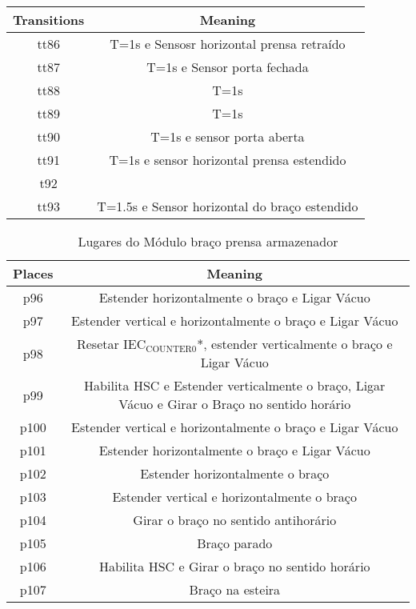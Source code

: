 \begin{center}
\begin{tabular}{c|c}
Transitions & Meaning\\
\hline
tt86 & T=1s e Sensosr horizontal prensa retraído\\
tt87 & T=1s e Sensor porta fechada\\
tt88 & T=1s\\
tt89 & T=1s\\
tt90 & T=1s e sensor porta aberta\\
tt91 & T=1s e sensor horizontal prensa estendido\\
t92 & \\
tt93 & T=1.5s e Sensor horizontal do braço estendido\\
\end{tabular}
\end{center}
\begin{table}[htbp]
\caption{Lugares do Módulo braço prensa armazenador}
\centering
\begin{tabular}{c|c}
Places & Meaning\\
\hline
p96 & Estender horizontalmente o braço e Ligar Vácuo\\
p97 & Estender vertical e horizontalmente o braço e Ligar Vácuo\\
p98 & Resetar IEC\(_{\text{COUNTER0}}\)*, estender verticalmente o braço e Ligar Vácuo\\
p99 & Habilita HSC e Estender verticalmente o braço, Ligar Vácuo e Girar o Braço no sentido horário\\
p100 & Estender vertical e horizontalmente o braço e Ligar Vácuo\\
p101 & Estender horizontalmente o braço e Ligar Vácuo\\
p102 & Estender horizontalmente o braço\\
p103 & Estender vertical e horizontalmente o braço\\
p104 & Girar o braço no sentido antihorário\\
p105 & Braço parado\\
p106 & Habilita HSC e Girar o braço no sentido horário\\
p107 & Braço na esteira\\
\end{tabular}
\end{table}

